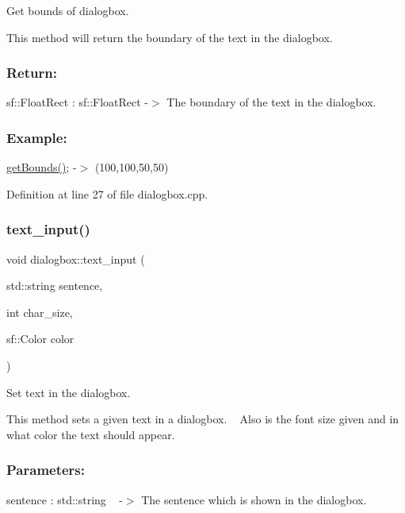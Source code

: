 Get bounds of dialogbox. 

This method will return the boundary of the text in the dialogbox.

\subsubsection*{Return\+: }

sf\+::\+Float\+Rect \+: sf\+::\+Float\+Rect -\/$>$ The boundary of the text in the dialogbox.

\subsubsection*{Example\+: }

\hyperlink{classdialogbox_aeb83bd7a568feeb4be10a0335838ae2a}{get\+Bounds()}; -\/$>$ (100,100,50,50) 

Definition at line 27 of file dialogbox.\+cpp.

\mbox{\label{classdialogbox_ab9d8f8b65c3a54ccaea57a941d43a176}} 
\subsubsection{\texorpdfstring{text\+\_\+input()}{text\_input()}}
{\footnotesize\ttfamily void dialogbox\+::text\+\_\+input (\begin{DoxyParamCaption}\item[{std\+::string}]{sentence,  }\item[{int}]{char\+\_\+size,  }\item[{sf\+::\+Color}]{color }\end{DoxyParamCaption})}



Set text in the dialogbox. 

This method sets a given text in a dialogbox. ~\newline
Also is the font size given and in what color the text should appear. ~\newline


\subsubsection*{Parameters\+: }

sentence \+: std\+::string ~\newline
-\/$>$ The sentence which is shown in the dialogbox.

